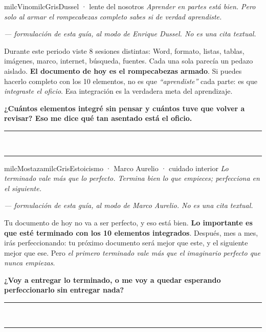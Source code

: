 \documentclass[11pt,letterpaper]{article}
\newcommand{\linead}[1]{\noindent\color{milcLinea}\rule{#1}{0.5pt}\color{milcNegro}}
\begin{document}
\begin{softbox}{milcVino}{milcGris}{Dussel · lente del nosotros}
\textit{Aprender en partes está bien. Pero solo al armar el rompecabezas completo sabes si de verdad aprendiste.}

{\footnotesize\itshape\color{milcNegro!70}--- formulación de esta guía, al modo de Enrique Dussel. No es una cita textual.}

Durante este periodo viste 8 sesiones distintas: Word, formato, listas, tablas, imágenes, marco, internet, búsqueda, fuentes. Cada una sola parecía un pedazo aislado. \textbf{El documento de hoy es el rompecabezas armado}. Si puedes hacerlo completo con los 10 elementos, no es que \emph{``aprendiste''} cada parte: es que \emph{integraste el oficio}. Esa integración es la verdadera meta del aprendizaje.

\textbf{¿Cuántos elementos integré sin pensar y cuántos tuve que volver a revisar? Eso me dice qué tan asentado está el oficio.}
\end{softbox}
\linead{\linewidth}\\[1mm]
\linead{\linewidth}

\begin{softbox}{milcMostaza}{milcGris}{Estoicismo · Marco Aurelio · cuidado interior}
\textit{Lo terminado vale más que lo perfecto. Termina bien lo que empieces; perfecciona en el siguiente.}

{\footnotesize\itshape\color{milcNegro!70}--- formulación de esta guía, al modo de Marco Aurelio. No es una cita textual.}

Tu documento de hoy no va a ser perfecto, y eso está bien. \textbf{Lo importante es que esté terminado con los 10 elementos integrados}. Después, mes a mes, irás perfeccionando: tu próximo documento será mejor que este, y el siguiente mejor que ese. Pero \emph{el primero terminado vale más que el imaginario perfecto que nunca empiezas}.

\textbf{¿Voy a entregar lo terminado, o me voy a quedar esperando perfeccionarlo sin entregar nada?}
\end{softbox}
\linead{\linewidth}\\[1mm]
\linead{\linewidth}
\end{document}
